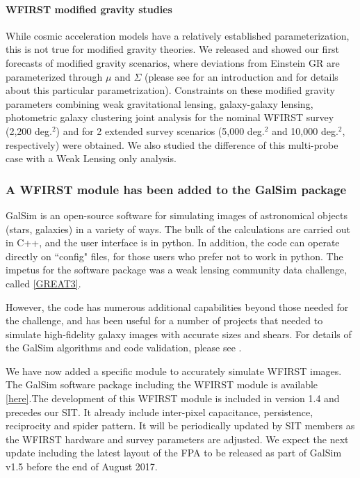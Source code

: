 \paragraph{WFIRST modified gravity studies} While cosmic acceleration models have a relatively established parameterization, this is not true for modified gravity theories. We released and showed our first forecasts of modified gravity scenarios, where deviations from Einstein GR are parameterized through $\mu$ and $\Sigma$ (please see \citet{Joyce:2016vqv} for an introduction and \citet{Simpson:2012ra} for details about this particular parametrization). Constraints on these modified gravity parameters combining weak gravitational lensing, galaxy-galaxy lensing, photometric galaxy clustering joint analysis for the nominal WFIRST survey (2,200 deg.$^2$) and for 2 extended survey scenarios (5,000 deg.$^2$ and 10,000 deg.$^2$, respectively) were obtained. We also studied the difference of this multi-probe case with a Weak Lensing only analysis.

\subsubsection{A WFIRST module has been added to the GalSim package}

GalSim is an open-source software for simulating images of astronomical objects (stars, galaxies) in a variety of ways. The bulk of the calculations are carried out in C++, and the user interface is in python. In addition, the code can operate directly on ``config" files, for those users who prefer not to work in python. The impetus for the software package was a weak lensing community data challenge, called \href{http://great3challenge.info/}{[GREAT3]}.

However, the code has numerous additional capabilities beyond those needed for the challenge, and has been useful for a number of projects that needed to simulate high-fidelity galaxy images with accurate sizes and shears. For details of the GalSim algorithms and code validation, please see \citet{Rowe:2015}.

We have now added a specific module to accurately simulate WFIRST images. The GalSim software package including the WFIRST module is available \href{https://github.com/GalSim-developers/GalSim}{[here]}.The development of this WFIRST module is included in version 1.4 and precedes our SIT. It already include inter-pixel capacitance, persistence, reciprocity and spider pattern. It will be periodically updated by SIT members as the WFIRST hardware and survey parameters are adjusted. We expect the next update including the latest layout of the FPA to be released as part of GalSim v1.5 before the end of August 2017.

